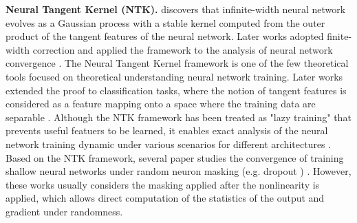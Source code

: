 \documentclass[10pt]{article} %
\theoremstyle{definition}
\theoremstyle{plain}
\begin{document}
\textbf{Neural Tangent Kernel (NTK).} \cite{jacot2018neural} discovers that infinite-width neural network evolves as a Gaussian process with a stable kernel computed from the outer product of the tangent features of the neural network. Later works adopted finite-width correction and applied the framework to the analysis of neural network convergence \cite{du2018gradient,du2019gradientdescentfindsglobal,oymak2019moderateoverparameterizationglobalconvergence}. 
The Neural Tangent Kernel framework is one of the few theoretical tools focused on theoretical understanding neural network training. Later works extended the proof to classification tasks, where the notion of tangent features is considered as a feature mapping onto a space where the training data are separable \cite{ji2020polylogarithmicwidthsufficesgradient}. Although the NTK framework has been treated as "lazy training" that prevents useful featuers to be learned, it enables exact analysis of the neural network training dynamic under various scenarios for different architectures \cite{nguyen2021proofglobalconvergencegradient, du2019graphneuraltangentkernel,truong2025globalconvergenceratedeep,wu2023convergenceencoderonlyshallowtransformers}. Based on the NTK framework, several paper studies the convergence of training shallow neural networks under random neuron masking (e.g. dropout \cite{srivastava2014dropout}) \cite{liao2022convergence,mianjy2020convergence}. However, these works usually considers the masking applied after the nonlinearity is applied, which allows direct computation of the statistics of the output and gradient under randomness.
\end{document}
